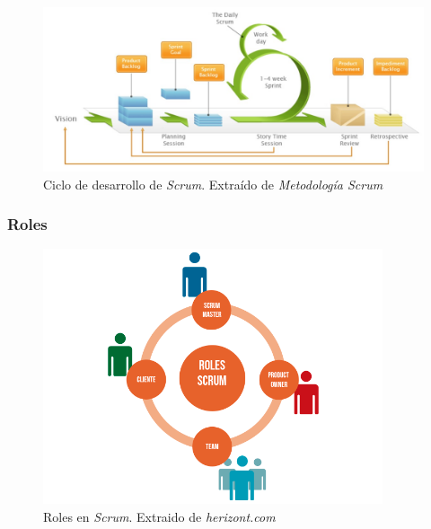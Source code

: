 \begin{figure}[H]
    \centering
    \includegraphics[width=14cm]{Images/Ciclo_Scrum.jpg}
    \caption{Ciclo de desarrollo de \textit{Scrum}. Extraído de \textit{Metodología Scrum} \autocite*{TrigasGallego2012}}
    \label{cicloScrum}
\end{figure}

\subsubsection{Roles}
\begin{figure}[H]
    \centering
    \includegraphics[width=10cm]{Images/roles.png}
    \caption{Roles en \textit{Scrum}. Extraido de \textit{herizont.com} \autocite*{ScrumRoles}}
\label{rolScrum}
\end{figure}

